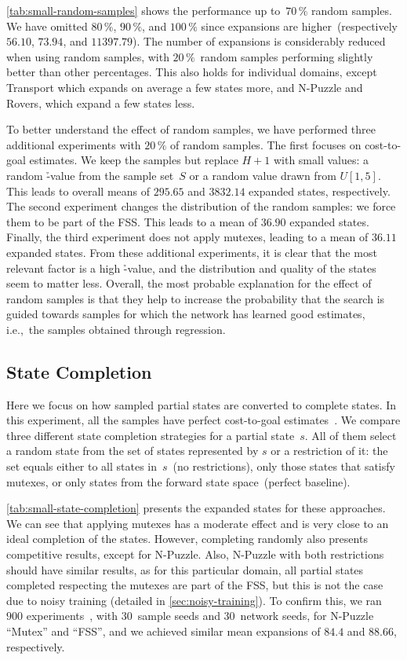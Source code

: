 \cref{tab:small-random-samples} shows the performance up to~$70\,\%$ random samples. We have omitted $80\,\%$, $90\,\%$, and $100\,\%$ since expansions are higher~(respectively $56.10$, $73.94$, and $11397.79$). The number of expansions is considerably reduced when using random samples, with $20\,\%$~random samples performing slightly better than other percentages. This also holds for individual domains, except Transport which expands on average a few states more, and N-Puzzle and Rovers, which expand a few states less.

To better understand the effect of random samples, we have performed three additional experiments with $20\,\%$ of random samples. The first focuses on cost-to-goal estimates. We keep the samples but replace $H+1$ with small values: a random \h-value from the sample set~$S$ or a random value drawn from $U[1,5]$. This leads to overall means of $295.65$ and $3832.14$ expanded states, respectively. The second experiment changes the distribution of the random samples: we force them to be part of the FSS. This leads to a mean of $36.90$ expanded states. Finally, the third experiment does not apply mutexes, leading to a mean of $36.11$ expanded states. From these additional experiments, it is clear that the most relevant factor is a high \h-value, and the distribution and quality of the states seem to matter less. Overall, the most probable explanation for the effect of random samples is that they help to increase the probability that the search is guided towards samples for which the network has learned good estimates, i.e.,~the samples obtained through regression.

\subsection{State Completion}
\label{sec:small-exps-state-completion}

Here we focus on how sampled partial states are converted to complete states. In this experiment, all the samples have perfect cost-to-goal estimates~\hstar. We compare three different state completion strategies for a partial state~$s$. All of them select a random state from the set of states represented by $s$ or a restriction of it: the set equals either to all states in~$s$~(no restrictions), only those states that satisfy mutexes, or only states from the forward state space~(perfect baseline).

\cref{tab:small-state-completion} presents the expanded states for these approaches. We can see that applying mutexes has a moderate effect and is very close to an ideal completion of the states. However, completing randomly also presents competitive results, except for N-Puzzle. Also, N-Puzzle with both restrictions should have similar results, as for this particular domain, all partial states completed respecting the mutexes are part of the FSS, but this is not the case due to noisy training (detailed in \cref{sec:noisy-training}). To confirm this, we ran $900$ experiments~, with $30$~sample seeds and $30$~network seeds, for N-Puzzle ``Mutex'' and ``FSS'', and we achieved similar mean expansions of $84.4$ and $88.66$, respectively.

